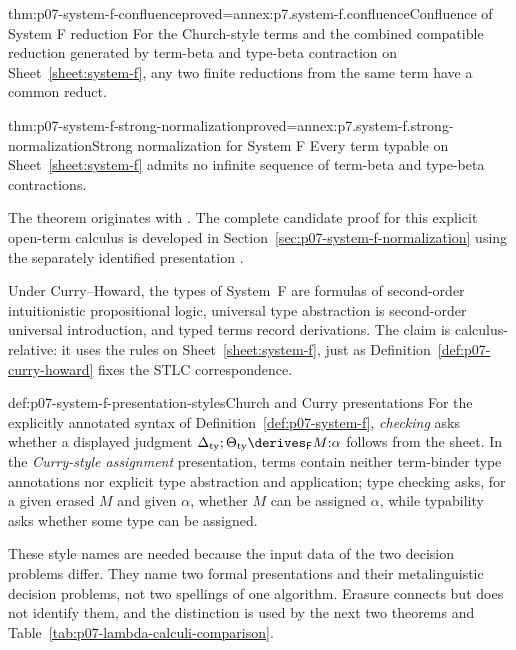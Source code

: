 \begin{hbtheorem}{thm:p07-system-f-confluence}{proved=annex:p7.system-f.confluence}{Confluence of System F reduction}
For the Church-style terms and the combined compatible reduction generated by
term-beta and type-beta contraction on Sheet~\ref{sheet:system-f}, any two
finite reductions from the same term have a common reduct.
\end{hbtheorem}

\begin{hbtheorem}{thm:p07-system-f-strong-normalization}{proved=annex:p7.system-f.strong-normalization}{Strong normalization for System F}
Every term typable on Sheet~\ref{sheet:system-f} admits no infinite sequence
of term-beta and type-beta contractions.
\end{hbtheorem}

The theorem originates with \cite{Girard1972}. The complete candidate proof
for this explicit open-term calculus is developed in
Section~\ref{sec:p07-system-f-normalization} using the separately identified
presentation \cite[Chapter~14]{GirardLafontTaylor2003Web}.

Under Curry--Howard, the types of System~F are formulas of second-order
intuitionistic propositional logic, universal type abstraction is
second-order universal introduction, and typed terms record derivations.  The
claim is calculus-relative: it uses the rules on Sheet~\ref{sheet:system-f},
just as Definition~\ref{def:p07-curry-howard} fixes the STLC correspondence.

\begin{hbdefinition}{def:p07-system-f-presentation-styles}{Church and Curry presentations}
For the explicitly annotated syntax of Definition~\ref{def:p07-system-f},
\emph{checking} asks whether a displayed judgment
\(\Delta_{\mathrm{ty}};\Theta_{\mathrm{ty}}\derives_{\mathsf F}M{:}\alpha\) follows from
the sheet.  In the \emph{Curry-style assignment} presentation, terms contain
neither term-binder type annotations nor explicit type abstraction and
application; type checking asks, for a given erased \(M\) and given
\(\alpha\), whether \(M\) can be assigned \(\alpha\), while typability asks
whether some type can be assigned.

These style names are needed because the input data of the two decision
problems differ.  They name two formal presentations and their metalinguistic
decision problems, not two spellings of one algorithm.  Erasure connects but
does not identify them, and the distinction is used by the next two theorems
and Table~\ref{tab:p07-lambda-calculi-comparison}.
\end{hbdefinition}

